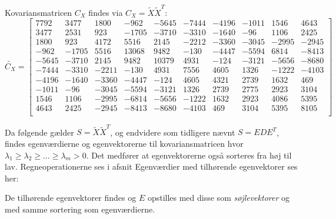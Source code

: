 Kovariansmatricen $C_{X}$ findes via $C_{X} = \tilde{X}\tilde{X}^T$:
\begin{equation}
\tilde{C_X}=\begin{bmatrix}
7792 & 3477 & 1800 & -962 & -5645 & -7444 & -4196 & -1011 & 1546 & 4643 \\
3477 & 2531 & 923 & -1705 & -3710 & -3310 & -1640 & -96 & 1106 & 2425 \\
1800 & 923 & 4172 & 5516 & 2145 & -2212 & -3360 & -3045 & -2995 & -2945 \\
-962 & -1705 & 5516 & 13068 & 9482 & -130 & -4447 & -5594 & 6814 & -8413 \\
-5645 & -3710 & 2145 & 9482 & 10379 & 4931 & -124 & -3121 & -5656 & -8680 \\
-7444 & -3310 & -2211 & -130 & 4931 & 7556 & 4605 & 1326 & -1222 & -4103 \\
-4196 & -1640 & -3360 & -4447 & -124 & 4605 & 4321 & 2739 & 1632 & 469 \\
-1011 & -96 & -3045 & -5594 & -3121 & 1326 & 2739 & 2775 & 2923 & 3104 \\
1546 & 1106 & -2995 & -6814 & -5656 & -1222 & 1632 & 2923 & 4086 & 5395 \\
4643 & 2425 & -2945 & -8413 & -8680 & -4103 & 469 & 3104 & 5395 & 8105 \\
\end{bmatrix}
\end{equation}


%
Da følgende gælder $S=\tilde{X}\tilde{X}^T$, og endvidere som tidligere nævnt $S = EDE^T$, findes egenværdierne og egenvektorerne til kovariansmatricen hvor $\lambda_1 \geq \lambda_2 \geq … \geq \lambda_m > 0$. Det medfører at egenvektorerne også sorteres fra høj til lav. Regneoperationerne ses i afsnit %
Egenværdier med tilhørende egenvektorer ses her:



%
De tilhørende egenvektorer findes og $E$ opstilles med disse som \emph{søjlevektorer} og med samme sortering som egenværdierne.

